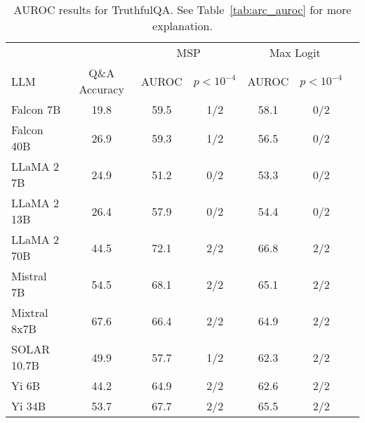 \begin{table*}
\centering
\caption{AUROC results for TruthfulQA. See Table~\ref{tab:arc_auroc} for more explanation.}
\label{tab:truthfulqa_auroc}
\begin{tabular}{lcccccc}
\toprule
& & \multicolumn{2}{c}{MSP} & \multicolumn{2}{c}{Max Logit} \\ 
LLM & Q\&A Accuracy & AUROC & $p < 10^{-4}$ & AUROC & $p < 10^{-4}$\\ 
\cmidrule(lr){1-1} \cmidrule(lr){2-2} \cmidrule(lr){3-4} \cmidrule(lr){5-6}
Falcon 7B & 19.8 & 59.5 & 1/2 & 58.1 & 0/2 \\
Falcon 40B & 26.9 & 59.3 & 1/2 & 56.5 & 0/2 \\
LLaMA 2 7B & 24.9 & 51.2 & 0/2 & 53.3 & 0/2 \\
LLaMA 2 13B & 26.4 & 57.9 & 0/2 & 54.4 & 0/2 \\
LLaMA 2 70B & 44.5 & 72.1 & 2/2 & 66.8 & 2/2 \\
Mistral 7B & 54.5 & 68.1 & 2/2 & 65.1 & 2/2 \\
Mixtral 8x7B & 67.6 & 66.4 & 2/2 & 64.9 & 2/2 \\
SOLAR 10.7B & 49.9 & 57.7 & 1/2 & 62.3 & 2/2 \\
Yi 6B & 44.2 & 64.9 & 2/2 & 62.6 & 2/2 \\
Yi 34B & 53.7 & 67.7 & 2/2 & 65.5 & 2/2 \\
\bottomrule
\end{tabular}
\end{table*}


